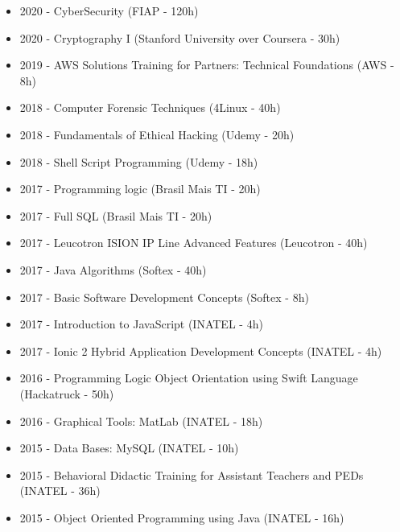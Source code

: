 \documentclass[10pt,a4paper,ragged2e, normalphoto]{altacv}
\begin{document}
\begin{fullwidth}

\begin{itemize}
    \item 2020 - CyberSecurity (FIAP - 120h)
    \item 2020 - Cryptography I (Stanford University over Coursera - 30h)
    \item 2019 - AWS Solutions Training for Partners: Technical Foundations (AWS - 8h)
    \item 2018 - Computer Forensic Techniques (4Linux - 40h)
    \item 2018 - Fundamentals of Ethical Hacking (Udemy - 20h)
    \item 2018 - Shell Script Programming (Udemy - 18h)
    \item 2017 - Programming logic (Brasil Mais TI - 20h)
    \item 2017 - Full SQL (Brasil Mais TI - 20h)
    \item 2017 - Leucotron ISION IP Line Advanced Features (Leucotron - 40h)
    \item 2017 - Java Algorithms (Softex - 40h)
    \item 2017 - Basic Software Development Concepts (Softex - 8h)
    \item 2017 - Introduction to JavaScript (INATEL - 4h)
    \item 2017 - Ionic 2 Hybrid Application Development Concepts (INATEL - 4h)
    \item 2016 - Programming Logic Object Orientation using Swift Language (Hackatruck - 50h)
    \item 2016 - Graphical Tools: MatLab (INATEL - 18h)
    \item 2015 - Data Bases: MySQL (INATEL - 10h)
    \item 2015 - Behavioral Didactic Training for Assistant Teachers and PEDs (INATEL - 36h)
    \item 2015 - Object Oriented Programming using Java (INATEL - 16h)
\end{itemize}

\end{fullwidth}
\end{document}
